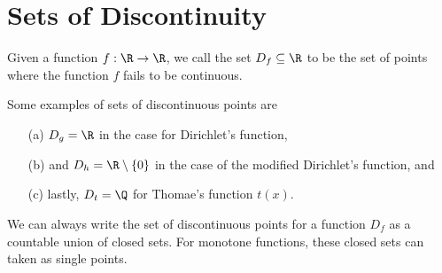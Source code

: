 \section{Sets of Discontinuity} 

\begin{tcolorbox}
\begin{defn}
Given a function \( f: \R \to \R  \), we call the set \( D_f \subseteq \R  \) to be the set of points where the function \( f  \) fails to be continuous.
\end{defn}
\end{tcolorbox}

Some examples of sets of discontinuous points are
\begin{enumerate}
    \item[(a)] \( D_g = \R  \) in the case for Dirichlet's function, 
    \item[(b)] and \( D_{h} = \R \setminus \{ 0 \}  \) in the case of the modified Dirichlet's function, and 
    \item[(c)] lastly, \( D_{t} = \Q  \) for Thomae's function \( t(x)  \).
\end{enumerate}

We can always write the set of discontinuous points for a function \( D_f  \) as a countable union of closed sets. For monotone functions, these closed sets can taken as single points.
